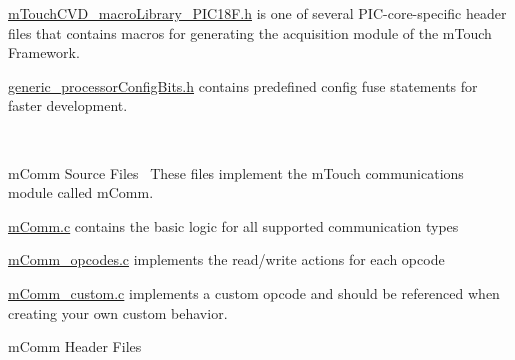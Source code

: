 \begin{DoxyItemize}
\begin{DoxyItemize}
\begin{DoxyItemize}
\begin{DoxyItemize}
\begin{DoxyItemize}
\item \hyperlink{m_touch_c_v_d__macro_library___p_i_c18_f_8h}{m\+Touch\+C\+V\+D\+\_\+macro\+Library\+\_\+\+P\+I\+C18\+F.\+h} is one of several P\+I\+C-\/core-\/specific header files that contains macros for generating the acquisition module of the m\+Touch Framework. 
\item \hyperlink{generic__processor_config_bits_8h}{generic\+\_\+processor\+Config\+Bits.\+h} contains predefined config fuse statements for faster development. 
\end{DoxyItemize}~\newline
 
\item m\+Comm Source Files~\newline
 These files implement the m\+Touch communications module called \textquotesingle{}m\+Comm\textquotesingle{}. 
\begin{DoxyItemize}
\item \hyperlink{m_comm_8c}{m\+Comm.\+c} contains the basic logic for all supported communication types 
\item \hyperlink{m_comm__opcodes_8c}{m\+Comm\+\_\+opcodes.\+c} implements the read/write actions for each opcode 
\item \hyperlink{m_comm__custom_8c}{m\+Comm\+\_\+custom.\+c} implements a custom opcode and should be referenced when creating your own custom behavior. 
\end{DoxyItemize}
\item m\+Comm Header Files~\newline
 

\end{DoxyItemize}
\end{DoxyItemize}
\end{DoxyItemize}
\end{DoxyItemize}
